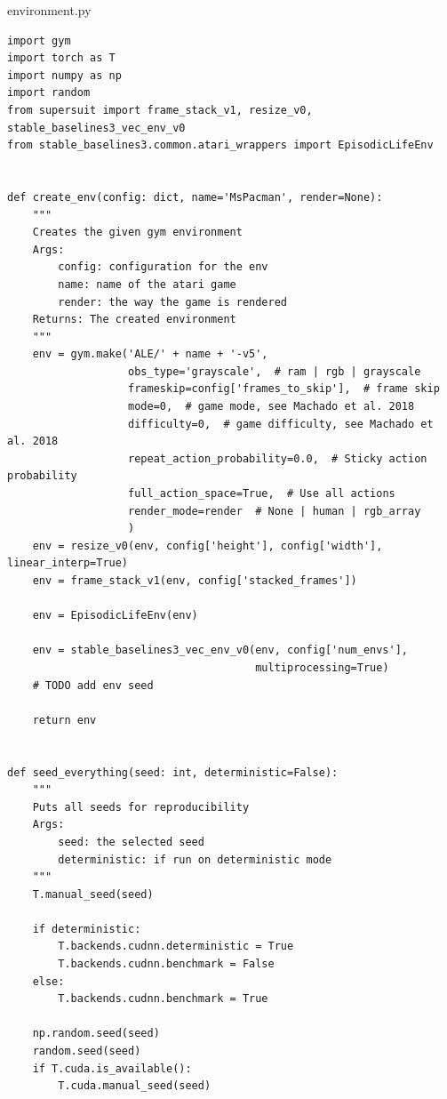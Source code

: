 \documentclass{article}
\begin{document}
environment.py
\begin{lstlisting}
import gym
import torch as T
import numpy as np
import random
from supersuit import frame_stack_v1, resize_v0, stable_baselines3_vec_env_v0
from stable_baselines3.common.atari_wrappers import EpisodicLifeEnv


def create_env(config: dict, name='MsPacman', render=None):
    """
    Creates the given gym environment
    Args:
        config: configuration for the env
        name: name of the atari game
        render: the way the game is rendered
    Returns: The created environment
    """
    env = gym.make('ALE/' + name + '-v5',
                   obs_type='grayscale',  # ram | rgb | grayscale
                   frameskip=config['frames_to_skip'],  # frame skip
                   mode=0,  # game mode, see Machado et al. 2018
                   difficulty=0,  # game difficulty, see Machado et al. 2018
                   repeat_action_probability=0.0,  # Sticky action probability
                   full_action_space=True,  # Use all actions
                   render_mode=render  # None | human | rgb_array
                   )
    env = resize_v0(env, config['height'], config['width'], linear_interp=True)
    env = frame_stack_v1(env, config['stacked_frames'])

    env = EpisodicLifeEnv(env)

    env = stable_baselines3_vec_env_v0(env, config['num_envs'],
                                       multiprocessing=True)
    # TODO add env seed

    return env


def seed_everything(seed: int, deterministic=False):
    """
    Puts all seeds for reproducibility
    Args:
        seed: the selected seed
        deterministic: if run on deterministic mode
    """
    T.manual_seed(seed)

    if deterministic:
        T.backends.cudnn.deterministic = True
        T.backends.cudnn.benchmark = False
    else:
        T.backends.cudnn.benchmark = True

    np.random.seed(seed)
    random.seed(seed)
    if T.cuda.is_available():
        T.cuda.manual_seed(seed)
\end{lstlisting}
\newpage
\end{document}
